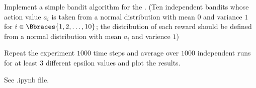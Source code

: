 \begin{exercise}
Implement a simple bandit algorithm for the .
(Ten independent bandits whose action value $a_i$ is taken from a normal distribution with mean $0$ and variance $1$ for $i \in \Bbraces{1, 2, \dots, 10}$; the distribution of each reward should be defined from a normal distribution with mean $a_i$ and varience $1$)

Repeat the experiment $1000$ time steps and average over $1000$ independent runs for at least $3$ different epsilon values and plot the results.

\end{exercise}

\begin{solution}
See .ipynb file.
\end{solution}
